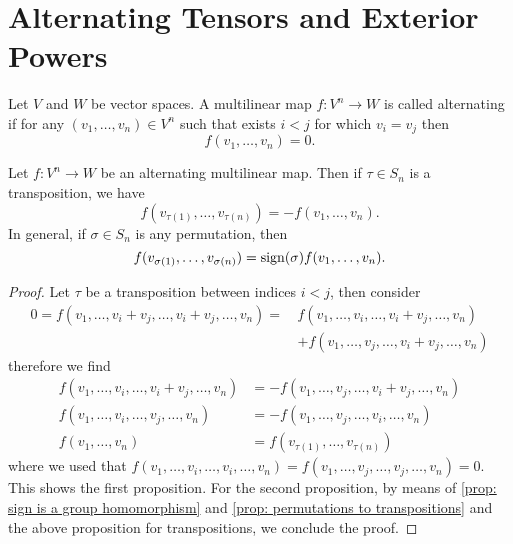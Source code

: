 \section{Alternating Tensors and Exterior Powers}

\begin{definition}
    \label{def: alternating map}
    Let \(V\) and \(W\) be vector spaces. A multilinear map \(f: V^n \to W\) is
    called alternating if for any \((v_1, \dots, v_n) \in V^n\) such that exists \(i
    < j\) for which \(v_i = v_j\) then
    \[
        f(v_1, \dots, v_n) = 0.
    \]
\end{definition}

\begin{proposition}\label{prop: alternating map property}
    Let \(f: V^n \to W\) be an alternating multilinear map. Then if \(\tau \in
    S_n\) is a transposition, we have
    \[
        f(v_{\tau(1)}, \dots, v_{\tau(n)}) = - f(v_1, \dots, v_n).
    \]
    In general, if \(\sigma \in S_n\) is any permutation, then
    \[
        f(v_{\sigma(1)}, \dots, v_{\sigma(n)}) = \operatorname{sign}(\sigma) f(v_1,
        \dots, v_n).
    \]
\end{proposition}

\begin{proof}
    Let \(\tau\) be a transposition between indices \(i < j\), then consider
    \begin{align*}
        0 = f(v_1, \dots, v_i + v_j, \dots, v_i + v_j, \dots, v_n)
        =\, & f(v_1, \dots, v_i, \dots, v_i + v_j, \dots, v_n)   \\
            & + f(v_1, \dots, v_j, \dots, v_i + v_j, \dots, v_n)
    \end{align*}
    therefore we find
    \begin{align*}
        f(v_1, \dots, v_i, \dots, v_i + v_j, \dots, v_n)
         & = - f(v_1, \dots, v_j, \dots, v_i + v_j, \dots, v_n) \\
        f(v_1, \dots, v_i, \dots, v_j, \dots, v_n)
         & = - f(v_1, \dots, v_j, \dots, v_i, \dots, v_n)       \\
        f(v_1, \dots, v_n)
         & = f(v_{\tau(1)}, \dots, v_{\tau(n)})
    \end{align*}
    where we used that \(f(v_1, \dots, v_i, \dots, v_i, \dots, v_n) = f(v_1,
    \dots, v_j, \dots, v_j, \dots, v_n) = 0\). This shows the first proposition.
    For the second proposition, by means of \cref{prop: sign is a group
        homomorphism} and \cref{prop: permutations to transpositions} and the above
    proposition for transpositions, we conclude the proof.
\end{proof}

